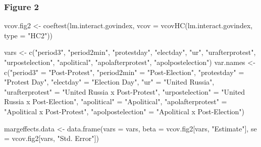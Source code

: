 \documentclass[
  letterpaper,
  DIV=11,
  numbers=noendperiod]{scrartcl}
\newenvironment{Shaded}{\begin{snugshade}}{\end{snugshade}}
\newcommand{\AttributeTok}[1]{\textcolor[rgb]{0.40,0.45,0.13}{#1}}
\newcommand{\FunctionTok}[1]{\textcolor[rgb]{0.28,0.35,0.67}{#1}}
\newcommand{\NormalTok}[1]{\textcolor[rgb]{0.00,0.23,0.31}{#1}}
\newcommand{\OtherTok}[1]{\textcolor[rgb]{0.00,0.23,0.31}{#1}}
\newcommand{\StringTok}[1]{\textcolor[rgb]{0.13,0.47,0.30}{#1}}
\begin{document}
\subsubsection{Figure 2}\label{figure-2}

\begin{Shaded}
\begin{Highlighting}[]
\NormalTok{vcov.fig2 }\OtherTok{\textless{}{-}} \FunctionTok{coeftest}\NormalTok{(lm.interact.govindex, }\AttributeTok{vcov =} \FunctionTok{vcovHC}\NormalTok{(lm.interact.govindex, }\AttributeTok{type =} \StringTok{"HC2"}\NormalTok{))}

\NormalTok{vars }\OtherTok{\textless{}{-}} \FunctionTok{c}\NormalTok{(}\StringTok{"period3"}\NormalTok{, }\StringTok{"period2min"}\NormalTok{, }\StringTok{"protestday"}\NormalTok{, }\StringTok{"electday"}\NormalTok{, }\StringTok{"ur"}\NormalTok{, }\StringTok{"urafterprotest"}\NormalTok{, }\StringTok{"urpostelection"}\NormalTok{, }\StringTok{"apolitical"}\NormalTok{, }\StringTok{"apolafterprotest"}\NormalTok{, }\StringTok{"apolpostelection"}\NormalTok{)}
\NormalTok{var.names }\OtherTok{\textless{}{-}} \FunctionTok{c}\NormalTok{(}\StringTok{"period3"} \OtherTok{=} \StringTok{"Post{-}Protest"}\NormalTok{,}
               \StringTok{"period2min"} \OtherTok{=} \StringTok{"Post{-}Election"}\NormalTok{,}
               \StringTok{"protestday"} \OtherTok{=} \StringTok{"Protest Day"}\NormalTok{,}
               \StringTok{"electday"} \OtherTok{=} \StringTok{"Election Day"}\NormalTok{,}
               \StringTok{"ur"} \OtherTok{=} \StringTok{"United Russia"}\NormalTok{,}
               \StringTok{"urafterprotest"} \OtherTok{=} \StringTok{"United Russia x Post{-}Protest"}\NormalTok{,}
               \StringTok{"urpostelection"} \OtherTok{=} \StringTok{"United Russia x Post{-}Election"}\NormalTok{,}
               \StringTok{"apolitical"} \OtherTok{=} \StringTok{"Apolitical"}\NormalTok{,}
               \StringTok{"apolafterprotest"} \OtherTok{=} \StringTok{"Apolitical x Post{-}Protest"}\NormalTok{,}
               \StringTok{"apolpostelection"} \OtherTok{=} \StringTok{"Apolitical x Post{-}Election"}\NormalTok{)}

\NormalTok{margeffects.data }\OtherTok{\textless{}{-}} \FunctionTok{data.frame}\NormalTok{(}\AttributeTok{vars =}\NormalTok{ vars,}
                               \AttributeTok{beta =}\NormalTok{ vcov.fig2[vars, }\StringTok{"Estimate"}\NormalTok{],}
                               \AttributeTok{se =}\NormalTok{ vcov.fig2[vars, }\StringTok{"Std. Error"}\NormalTok{])}


\end{Highlighting}
\end{Shaded}
\end{document}
